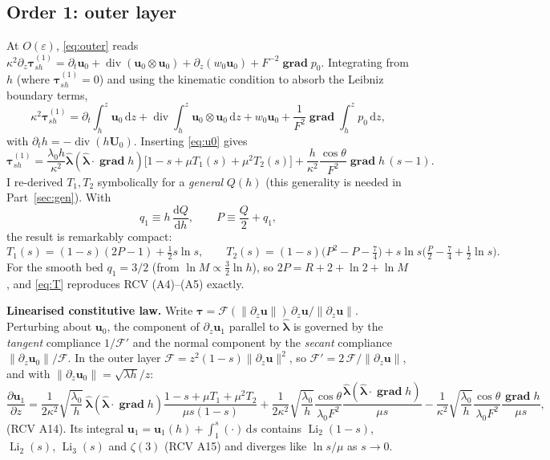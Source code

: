 \documentclass[10pt,a4paper]{article}
\newcommand{\bu}{\bm{u}}
\newcommand{\bU}{\bm{U}}
\newcommand{\btau}{\bm{\tau}}
\newcommand{\hlam}{\hat{\bm{\lambda}}}
\newcommand{\grad}{\operatorname{\mathbf{grad}}}
\newcommand{\dvg}{\operatorname{div}}
\newcommand{\Li}{\operatorname{Li}}
\newcommand{\dd}{\mathrm{d}}
\begin{document}
\subsection{Order 1: outer layer}
At $O(\varepsilon)$, \eqref{eq:outer} reads $\kappa^2\partial_z\btau^{(1)}_{sh}=\partial_t\bu_0+\dvg(\bu_0\otimes\bu_0)+\partial_z(w_0\bu_0)+F^{-2}\grad p_0$. Integrating from $h$ (where $\btau^{(1)}_{sh}=0$) and using the kinematic condition to absorb the Leibniz boundary terms,
\begin{equation}\label{eq:A2}
\kappa^2\btau^{(1)}_{sh}=\partial_t\!\int_h^z\!\bu_0\,\dd z+\dvg\!\int_h^z\!\bu_0\otimes\bu_0\,\dd z+w_0\bu_0+\frac{1}{F^2}\grad\!\int_h^z\!p_0\,\dd z ,
\end{equation}
with $\partial_th=-\dvg(h\bU_0)$. Inserting \eqref{eq:u0} gives
\begin{equation}\label{eq:tau1}
\btau^{(1)}_{sh}=\frac{\lambda_0h}{\kappa^2}\hlam(\hlam\cdot\grad h)\big[1-s+\mu T_1(s)+\mu^2T_2(s)\big]+\frac{h}{\kappa^2}\frac{\cos\theta}{F^2}\grad h\,(s-1).
\end{equation}
I re-derived $T_1,T_2$ symbolically for a \emph{general} $Q(h)$ (this generality is needed in Part~\ref{sec:gen}). With
\begin{equation}
q_1\equiv h\,\frac{\dd Q}{\dd h},\qquad P\equiv \frac Q2+q_1,
\end{equation}
the result is remarkably compact:
\begin{equation}\label{eq:T}
T_1(s)=(1-s)(2P-1)+\tfrac12 s\ln s,\qquad
T_2(s)=(1-s)\big(P^2-P-\tfrac74\big)+s\ln s\big(\tfrac P2-\tfrac74+\tfrac12\ln s\big).
\end{equation}
For the smooth bed $q_1=3/2$ (from $\ln M\propto\frac32\ln h$), so $2P=R+2+\ln2+\ln M$, and \eqref{eq:T} reproduces RCV (A4)--(A5) exactly.

\textbf{Linearised constitutive law.} Write $\bm\tau=\mathcal F(\|\partial_z\bu\|)\,\partial_z\bu/\|\partial_z\bu\|$. Perturbing about $\bu_0$, the component of $\partial_z\bu_1$ parallel to $\hlam$ is governed by the \emph{tangent} compliance $1/\mathcal F'$ and the normal component by the \emph{secant} compliance $\|\partial_z\bu_0\|/\mathcal F$. In the outer layer $\mathcal F=z^2(1-s)\|\partial_z\bu\|^2$, so $\mathcal F'=2\,\mathcal F/\|\partial_z\bu\|$, and with $\|\partial_z\bu_0\|=\sqrt{\lambda h}/z$:
\begin{equation}\label{eq:du1}
\frac{\partial\bu_1}{\partial z}=\frac{1}{2\kappa^2}\sqrt{\frac{\lambda_0}{h}}\,\hlam(\hlam\cdot\grad h)\frac{1-s+\mu T_1+\mu^2T_2}{\mu s(1-s)}
+\frac{1}{2\kappa^2}\sqrt{\frac{\lambda_0}{h}}\frac{\cos\theta}{\lambda_0F^2}\frac{\hlam(\hlam\cdot\grad h)}{\mu s}
-\frac{1}{\kappa^2}\sqrt{\frac{\lambda_0}{h}}\frac{\cos\theta}{\lambda_0F^2}\frac{\grad h}{\mu s},
\end{equation}
(RCV A14). Its integral $\bu_1=\bu_1(h)+\int_1^s(\cdot)\,\dd s$ contains $\Li_2(1-s)$, $\Li_2(s)$, $\Li_3(s)$ and $\zeta(3)$ (RCV A15) and diverges like $\ln s/\mu$ as $s\to0$.
\end{document}
